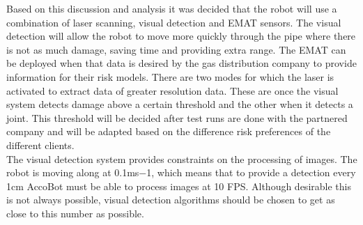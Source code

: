 \documentclass[11pt]{article}		%
\newcommand{\supercite}[1]{\textsuperscript{\cite{#1}}}		%
\begin{document}
Based on this discussion and analysis it was decided that the robot will use a combination of laser scanning, visual detection and EMAT sensors. The visual detection will allow the robot to move more quickly through the pipe where there is not as much damage, saving time and providing extra range. The EMAT can be deployed when that data is desired by the gas distribution company to provide information for their risk models. There are two modes for which the laser is activated to extract  data of greater resolution data. These are once the visual system detects damage above a certain threshold and the other when it detects a joint. This threshold will be decided after test runs are done with the partnered company and will be adapted based on the difference risk preferences of the different clients.
\\ \hspace*{3ex}
The visual detection system provides constraints on the processing of images. The robot is moving along at 0.1ms−1, which means that to provide a detection every 1cm AccoBot must be able to process images at 10 FPS. Although desirable this is not always possible, visual detection algorithms should be chosen to get as close to this number as possible.
	        \
	        \\
	        
	        
	        
\end{document}

